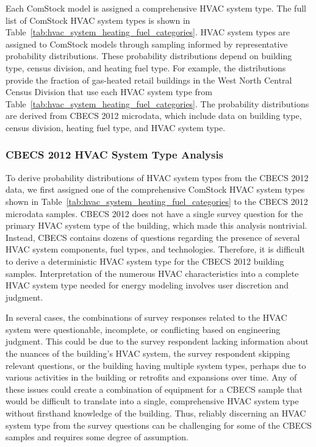Each ComStock model is assigned a comprehensive HVAC system type. The full list of ComStock HVAC system types is shown in Table~\ref{tab:hvac_system_heating_fuel_categories}. HVAC system types are assigned to ComStock models through sampling informed by representative probability distributions. These probability distributions depend on building type, census division, and heating fuel type. For example, the distributions provide the fraction of gas-heated retail buildings in the West North Central Census Division that use each HVAC system type from Table~\ref{tab:hvac_system_heating_fuel_categories}. The probability distributions are derived from CBECS 2012 microdata, which include data on building type, census division, heating fuel type, and HVAC system type.



\subsubsection{CBECS 2012 HVAC System Type Analysis}

To derive probability distributions of HVAC system types from the CBECS 2012 data, we first assigned one of the comprehensive ComStock HVAC system types shown in Table~\ref{tab:hvac_system_heating_fuel_categories} to the CBECS 2012 microdata samples. CBECS 2012 does not have a single survey question for the primary HVAC system type of the building, which made this analysis nontrivial. Instead, CBECS contains dozens of questions regarding the presence of several HVAC system components, fuel types, and technologies. Therefore, it is difficult to derive a deterministic HVAC system type for the CBECS 2012 building samples. Interpretation of the numerous HVAC characteristics into a complete HVAC system type needed for energy modeling involves user discretion and judgment.

In several cases, the combinations of survey responses related to the HVAC system were questionable, incomplete, or conflicting based on engineering judgment. This could be due to the survey respondent lacking information about the nuances of the building's HVAC system, the survey respondent skipping relevant questions, or the building having multiple system types, perhaps due to various activities in the building or retrofits and expansions over time. Any of these issues could create a combination of equipment for a CBECS sample that would be difficult to translate into a single, comprehensive HVAC system type without firsthand knowledge of the building. Thus, reliably discerning an HVAC system type from the survey questions can be challenging for some of the CBECS samples and requires some degree of assumption.

